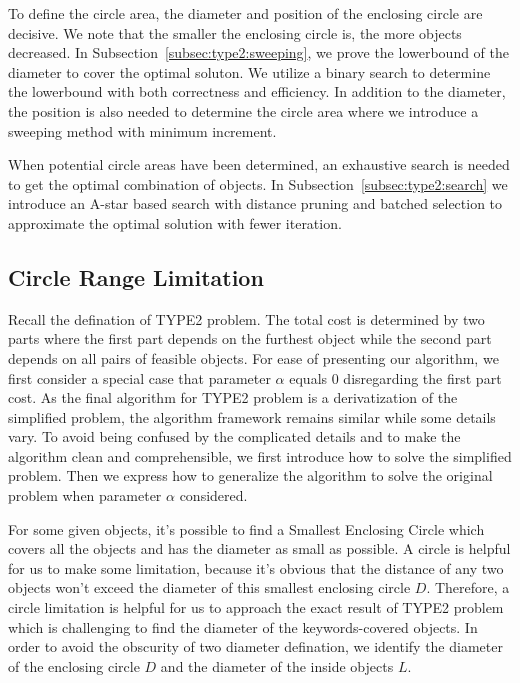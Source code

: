 \documentclass{sig-alternate}
\begin{document}
To define the circle area, the diameter and position of the enclosing circle are decisive.
We note that the smaller the enclosing circle is, the more objects decreased.
In Subsection~\ref{subsec:type2:sweeping},
we prove the lowerbound of the diameter to cover the optimal soluton. We utilize
a binary search to determine the lowerbound with both correctness and efficiency.
In addition to the diameter, the position is also needed to determine the circle area
where we introduce a sweeping method with minimum increment.
%

When potential circle areas have been determined, an exhaustive search is needed
to get the optimal combination of objects. In Subsection~\ref{subsec:type2:search}
we introduce an A-star based search with distance pruning and batched selection
to approximate the optimal solution with fewer iteration.

\subsection{Circle Range Limitation} \label{subsec:type2:limitation}
Recall the defination of \textsf{TYPE2} problem. The total cost is determined
by two parts where the first part depends on the furthest object while
the second part depends on all pairs of feasible objects.
For ease of presenting our algorithm, we first consider a special case that
parameter $\alpha$ equals 0 disregarding the first part cost.
As the final algorithm for \textsf{TYPE2} problem is a derivatization
of the simplified problem, the algorithm framework remains similar
while some details vary. To avoid being confused by the complicated details
and to make the algorithm clean and comprehensible,
we first introduce how to solve the simplified problem.
Then we express how to generalize the algorithm to solve the original
problem when parameter $\alpha$ considered.
%

For some given objects, it's possible to find a \textsf{Smallest Enclosing Circle}
which covers all the objects and has the diameter as small as possible. A circle is
helpful for us to make some limitation, because it's obvious that the distance of
any two objects won't exceed the diameter of this smallest enclosing circle $D$.
Therefore, a circle limitation is helpful for us to approach the exact result
of \textsf{TYPE2} problem which is challenging to find the diameter of the keywords-covered
objects. In order to avoid the obscurity of two diameter defination, we identify the
diameter of the enclosing circle $D$ and the diameter of the inside objects $L$.\par
%
\end{document}
